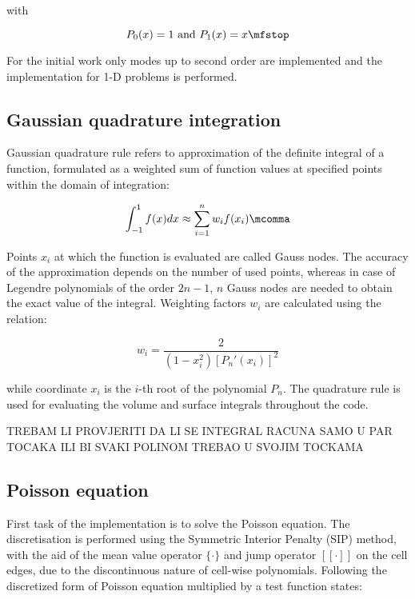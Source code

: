 \documentclass[11pt, a4paper]{article}
\begin{document}
with

\begin{equation}
    P_0(x) = 1 \textrm{ and }  P_1(x) = x \mfstop
\label{eq:4}
\end{equation}


\noindent For the initial work only modes up to second order are implemented and
the implementation for 1-D problems is performed.


\subsection{Gaussian quadrature integration}

Gaussian quadrature rule refers to approximation of the definite integral of a
function, formulated as a weighted sum of function values at specified points
within the domain of integration:

\begin{equation}
    \int_{-1}^{1} f(x) dx \approx \sum_{i=1}^{n} w_i f(x_i) \mcomma
\label{eq:5}
\end{equation}

Points $x_i$ at which the function is evaluated are called Gauss nodes.
The accuracy of the approximation depends on the number of used points, whereas
in case of Legendre polynomials of the order $2n-1$, $n$ Gauss nodes are needed
to obtain the exact value of the integral.
Weighting factors $w_i$ are calculated using the relation:

\begin{equation}
    w_i = \dfrac{2}{(1-x_i^2)[P_n'(x_i)]^2}
\label{eq:6}
\end{equation}

\noindent while coordinate $x_i$ is the $i$-th root of the polynomial $P_n$. The
quadrature rule is used for evaluating the volume and surface integrals
throughout the code.



TREBAM LI PROVJERITI DA LI SE INTEGRAL RACUNA SAMO U PAR TOCAKA ILI BI SVAKI
POLINOM TREBAO U SVOJIM TOCKAMA




\subsection{Poisson equation}

First task of the implementation is to solve the Poisson equation. The
discretisation is performed using the Symmetric Interior Penalty (SIP)
method, with the aid of the mean value operator $\{\cdot\}$ and jump operator
$[\![\cdot ]\!]$ on the cell edges, due to the discontinuous nature of cell-wise
polynomials. Following \cite{Kummer} the discretized form of Poisson equation
multiplied by a test function states:
\end{document}
